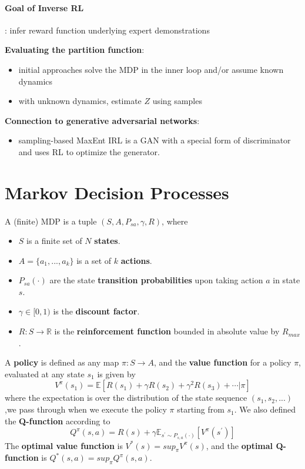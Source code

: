 \documentclass[12pt,a4paper]{article}
\begin{document}
\paragraph{Goal of Inverse RL}: infer reward function underlying expert demonstrations
\begin{tcolorbox}
\textbf{Evaluating the partition function}:
\begin{itemize}
	\item initial approaches solve the MDP in the inner loop and/or assume known dynamics
	\item with unknown dynamics, estimate $Z$ using samples
\end{itemize}

\textbf{Connection to generative adversarial networks}:
\begin{itemize}
	\item sampling-based MaxEnt IRL is a GAN with a special form of discriminator and uses RL to optimize the generator.
\end{itemize}
\end{tcolorbox}
\newpage

\section{Markov Decision Processes}
\paragraph{} A (finite) MDP is a tuple $(S, A, {P_{sa}}, \gamma, R)$, where
\begin{itemize}
	\item $S$ is a finite set of $N$ \textbf{states}.
	\item $A = \{a_{1}, ..., a_{k}\}$ is a set of $k$ \textbf{actions}.
	\item $P_{sa}(\cdot)$ are the state \textbf{transition probabilities} upon taking action $a$ in state $s$.
	\item $\gamma \in [0, 1)$ is the \textbf{discount factor}.
	\item $R : S \rightarrow \mathbb{R}$ is the \textbf{reinforcement function} bounded in absolute value by $R_{max}$.
\end{itemize}
A \textbf{policy} is defined as any map $\pi : S \rightarrow A$, and the \textbf{value function} for a policy $\pi$, evaluated at any state $s_{1}$ is given by 
\begin{equation}
V^{\pi}(s_{1}) = \mathbb{E}[R(s_{1}) + \gamma R(s_{2}) + \gamma^{2} R(s_{3}) + \cdots | \pi]
\end{equation}
where the expectation is over the distribution of the state sequence $(s_1, s_2, ...)$,we pass through when we execute the policy $\pi$ starting from $s_1$. We also defined the \textbf{Q-function} according to 
\begin{equation}
	Q^{\pi}(s,a) = R(s) + \gamma \mathbb{E}_{s^{'} \sim P_{s,a}(\cdot)}[V^{\pi}(s^{'})]
\end{equation}
The \textbf{optimal value function} is $V^{*}(s) = sup_{\pi}V^{\pi}(s)$, and the \textbf{optimal Q-function} is $Q^{*}(s,a)= sup_{\pi}Q^{\pi}(s,a)$.
\end{document}
